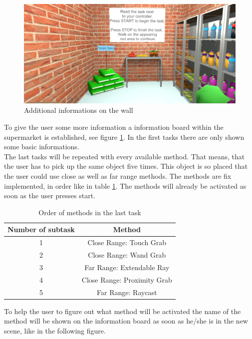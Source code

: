 \begin{figure}[H] 
	\center 
	\includegraphics[width=12cm]{Images/TaskWall_1.PNG}
	\caption[Additional informations on the wall]{Additional informations on the wall}
	\label{fig:taskW1}
\end{figure}

To give the user some more information a information board within the supermarket is established, see figure \ref{fig:taskW1}. In the first tasks there are only shown some basic informations.\\
The last tasks will be repeated with every available method. That means, that the user has to pick up the same object five times. This object is so placed that the user could use close as well as far range methods. The methods are fix implemented, in order like in table \ref{tab: OrderMethods}. The methods will already  be activated as soon as the user presses start. \\

\begin{table}[h]
\centering
 \begin{tabular}{|c|c|}
  Number of subtask & Method  \\ \hline
  1 & Close Range: Touch Grab  \\
  2 & Close Range: Wand Grab  \\
  3 & Far Range: Extendable Ray  \\
  4 & Close Range: Proximity Grab  \\
  5 & Far Range: Raycast \\
   \end{tabular}
  \caption[Order of methods in the last task]{Order of methods in the last task}
	\label{tab: OrderMethods}
 \end{table}

To help the user to figure out what method will be activated the name of the method will be shown on the information board as soon as  he/she is in the new scene, like in the following figure. 

